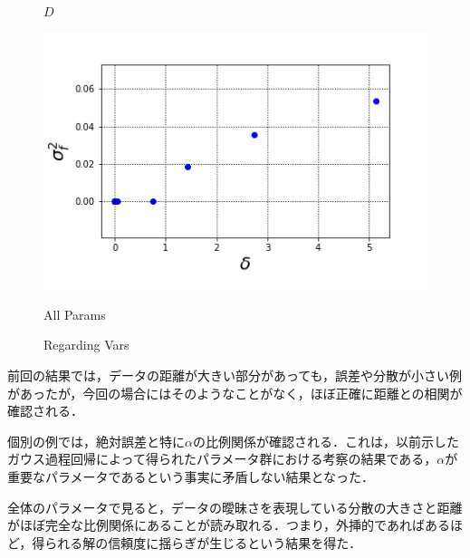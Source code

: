\documentclass[16.7pt]{jsarticle}
\begin{document}
\begin{figure}[h]
\begin{minipage}{0.45\hsize}
				\caption{$ D $}
			\end{minipage}
			\begin{minipage}{0.45\hsize}
				\centering
				\includegraphics[width= 0.85\columnwidth]{./figure/ERR_VARS.png}
				\caption{All Params}
			\end{minipage}
			\caption{Regarding Vars}
		\end{figure}
	前回の結果では，データの距離が大きい部分があっても，誤差や分散が小さい例があったが，今回の場合にはそのようなことがなく，ほぼ正確に距離との相関が確認される．
	
	個別の例では，絶対誤差と特に$ \alpha $の比例関係が確認される．これは，以前示したガウス過程回帰によって得られたパラメータ群における考察の結果である，$ \alpha $が重要なパラメータであるという事実に矛盾しない結果となった．
	
	全体のパラメータで見ると，データの曖昧さを表現している分散の大きさと距離がほぼ完全な比例関係にあることが読み取れる．つまり，外挿的であればあるほど，得られる解の信頼度に揺らぎが生じるという結果を得た．
	
\end{document}
